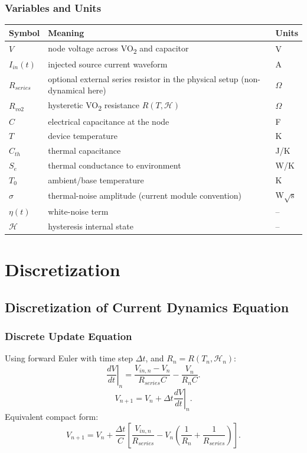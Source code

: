 \documentclass[11pt]{article}
\begin{document}
\subsubsection*{Variables and Units}
\begin{center}
\begin{tabular}{lll}
\toprule
Symbol & Meaning & Units \\
\midrule
\(V\) & node voltage across VO\textsubscript{2} and capacitor & V \\
\(I_{in}(t)\) & injected source current waveform & A \\
\(R_{series}\) & optional external series resistor in the physical setup (non-dynamical here) & \(\Omega\) \\
\(R_{vo2}\) & hysteretic VO\textsubscript{2} resistance \(R(T,\mathcal{H})\) & \(\Omega\) \\
\(C\) & electrical capacitance at the node & F \\
\(T\) & device temperature & K \\
\(C_{th}\) & thermal capacitance & J/K \\
\(S_e\) & thermal conductance to environment & W/K \\
\(T_0\) & ambient/base temperature & K \\
\(\sigma\) & thermal-noise amplitude (current module convention) & W\(\sqrt{\mathrm{s}}\) \\
\(\eta(t)\) & white-noise term & -- \\
\(\mathcal{H}\) & hysteresis internal state & -- \\
\bottomrule
\end{tabular}
\end{center}

\section{Discretization}

\subsection{Discretization of Current Dynamics Equation}
\subsubsection*{Discrete Update Equation}
Using forward Euler with time step \(\Delta t\), and \(R_n=R(T_n,\mathcal{H}_n)\):
\begin{equation}
\left.\frac{dV}{dt}\right|_{n}
=
\frac{V_{in,n}-V_n}{R_{series}C}
-\frac{V_n}{R_n C}.
\label{eq:disc_voltage_driven_dvdt}
\end{equation}
\begin{equation}
V_{n+1}
=
V_n
+\Delta t\left.\frac{dV}{dt}\right|_{n}.
\label{eq:disc_voltage_driven_v}
\end{equation}
Equivalent compact form:
\begin{equation}
V_{n+1}
=
V_n
+\frac{\Delta t}{C}
\left[
\frac{V_{in,n}}{R_{series}}
-V_n\left(\frac{1}{R_n}+\frac{1}{R_{series}}\right)
\right].
\label{eq:disc_voltage_driven_v_compact}
\end{equation}
\end{document}
